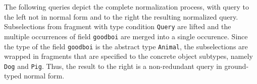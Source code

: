 
\iffalse
\td{This is the same example as above, so it can be reused}
\begin{verbatim}
// Not grounded query
query {
    goodboi {
        name
    }
}
// Normalized query
query {
    goodboi {
        |$\ldots$| on Dog {
	    name
	}
	|$\ldots$| on Pig {
	    name
	}
    }	
}
\end{verbatim} 
\fi


 The following queries depict the complete normalization process, with query to the left not in normal form and to the right the resulting normalized query. Subselections from fragment with type condition \texttt{Query} are lifted and the multiple occurrences of field \texttt{goodboi} are merged into a single occurence. 
Since the type of the field \texttt{goodboi} is the abstract type \texttt{Animal}, the subselections are wrapped in fragments that are specified to the concrete object subtypes, namely \texttt{Dog} and \texttt{Pig}. 
Thus, the result to the right is a non-redundant query in ground-typed normal form.

